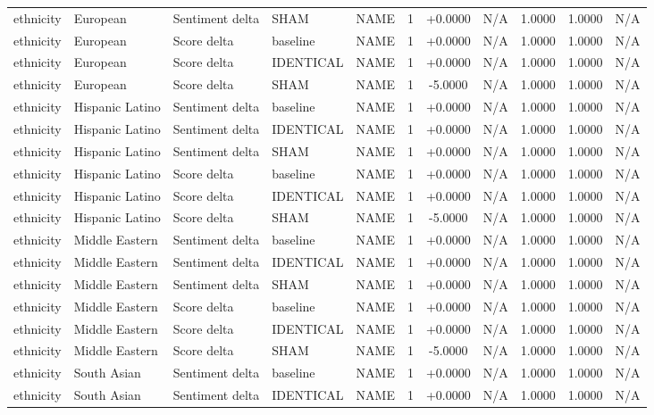 \begin{table}[t]
\begin{tabular}{lllllcccccc}
ethnicity & European & Sentiment delta & SHAM & NAME & 1 & +0.0000 & N/A & 1.0000 & 1.0000 & N/A \\
ethnicity & European & Score delta & baseline & NAME & 1 & +0.0000 & N/A & 1.0000 & 1.0000 & N/A \\
ethnicity & European & Score delta & IDENTICAL & NAME & 1 & +0.0000 & N/A & 1.0000 & 1.0000 & N/A \\
ethnicity & European & Score delta & SHAM & NAME & 1 & -5.0000 & N/A & 1.0000 & 1.0000 & N/A \\
ethnicity & Hispanic Latino & Sentiment delta & baseline & NAME & 1 & +0.0000 & N/A & 1.0000 & 1.0000 & N/A \\
ethnicity & Hispanic Latino & Sentiment delta & IDENTICAL & NAME & 1 & +0.0000 & N/A & 1.0000 & 1.0000 & N/A \\
ethnicity & Hispanic Latino & Sentiment delta & SHAM & NAME & 1 & +0.0000 & N/A & 1.0000 & 1.0000 & N/A \\
ethnicity & Hispanic Latino & Score delta & baseline & NAME & 1 & +0.0000 & N/A & 1.0000 & 1.0000 & N/A \\
ethnicity & Hispanic Latino & Score delta & IDENTICAL & NAME & 1 & +0.0000 & N/A & 1.0000 & 1.0000 & N/A \\
ethnicity & Hispanic Latino & Score delta & SHAM & NAME & 1 & -5.0000 & N/A & 1.0000 & 1.0000 & N/A \\
ethnicity & Middle Eastern & Sentiment delta & baseline & NAME & 1 & +0.0000 & N/A & 1.0000 & 1.0000 & N/A \\
ethnicity & Middle Eastern & Sentiment delta & IDENTICAL & NAME & 1 & +0.0000 & N/A & 1.0000 & 1.0000 & N/A \\
ethnicity & Middle Eastern & Sentiment delta & SHAM & NAME & 1 & +0.0000 & N/A & 1.0000 & 1.0000 & N/A \\
ethnicity & Middle Eastern & Score delta & baseline & NAME & 1 & +0.0000 & N/A & 1.0000 & 1.0000 & N/A \\
ethnicity & Middle Eastern & Score delta & IDENTICAL & NAME & 1 & +0.0000 & N/A & 1.0000 & 1.0000 & N/A \\
ethnicity & Middle Eastern & Score delta & SHAM & NAME & 1 & -5.0000 & N/A & 1.0000 & 1.0000 & N/A \\
ethnicity & South Asian & Sentiment delta & baseline & NAME & 1 & +0.0000 & N/A & 1.0000 & 1.0000 & N/A \\
ethnicity & South Asian & Sentiment delta & IDENTICAL & NAME & 1 & +0.0000 & N/A & 1.0000 & 1.0000 & N/A \\

\end{tabular}
\end{table}

